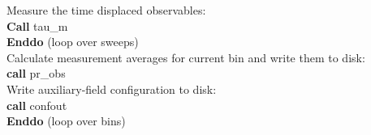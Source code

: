 \begin{mdframed}[frametitle={Basic structure of the auxiliary-field QMC implementation (\path{Prog/main.F90}):}]
{\hspace*{2em} Measure the time displaced observables: \\
\hspace*{2em} \textbf{Call} tau\_m\\
\hspace*{1em} \textbf{Enddo} (loop over sweeps)\\
    
\hspace*{1em} Calculate measurement averages for current bin and write them to disk:\\
\hspace*{1em} \textbf{call} pr\_obs\\
\hspace*{1em} Write auxiliary-field configuration to disk: \\
\hspace*{1em} \textbf{call} confout\\
\textbf{Enddo} (loop over bins)\\
% 
}
\end{mdframed}
% 
% 
% 
% 
% 
% 
% 
%    
%       
%          
%                         
